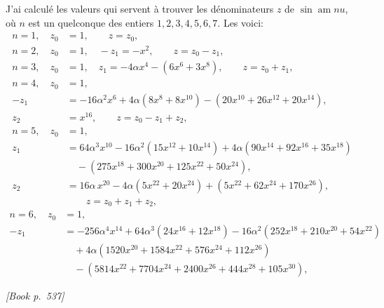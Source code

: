 \documentclass[11pt]{article}
\begin{document}
J'ai calcul\'e les valeurs qui servent \`a trouver les d\'enominateurs $z$ de $\sin\operatorname{am} nu$, o\`u $n$ est un quelconque des entiers $1, 2, 3, 4, 5, 6, 7$. Les voici:
\[
\begin{aligned}
n = 1,\quad z_{0} &= 1,\qquad z = z_{0},\\
n = 2,\quad z_{0} &= 1,\quad -z_{1} = -x^{2},\qquad z = z_{0} - z_{1},\\
n = 3,\quad z_{0} &= 1,\quad z_{1} = -4\alpha x^{4} - (6x^{6} + 3x^{8}),\qquad z = z_{0} + z_{1},\\
n = 4,\quad z_{0} &= 1,\\
-z_{1} &= -16\alpha^{2} x^{6} + 4\alpha(8x^{8} + 8x^{10}) - (20x^{10} + 26x^{12} + 20x^{14}),\\
z_{2} &= x^{16},\qquad z = z_{0} - z_{1} + z_{2},\\
n = 5,\quad z_{0} &= 1,\\
z_{1} &= 64\alpha^{3} x^{10} - 16\alpha^{2}(15x^{12} + 10x^{14}) + 4\alpha(90x^{14} + 92x^{16} + 35x^{18})\\
&\quad - (275x^{18} + 300x^{20} + 125x^{22} + 50x^{24}),\\
z_{2} &= 16\alpha\,x^{20} - 4\alpha(5x^{22} + 20x^{24}) + (5x^{22} + 62x^{24} + 170x^{26}),\\
&\qquad z = z_{0} + z_{1} + z_{2},
\end{aligned}
\]
\[
\begin{aligned}
n = 6,\quad z_{0} &= 1,\\
-z_{1} &= -256\alpha^{4} x^{14} + 64\alpha^{3}(24x^{16} + 12x^{18}) - 16\alpha^{2}(252x^{18} + 210x^{20} + 54x^{22})\\
&\quad + 4\alpha(1520x^{20} + 1584x^{22} + 576x^{24} + 112x^{26})\\
&\quad - (5814x^{22} + 7704x^{24} + 2400x^{26} + 444x^{28} + 105x^{30}),
\end{aligned}
\]

\medskip
\noindent\textit{[Book p.~537]}\hfill

\smallskip
\end{document}
